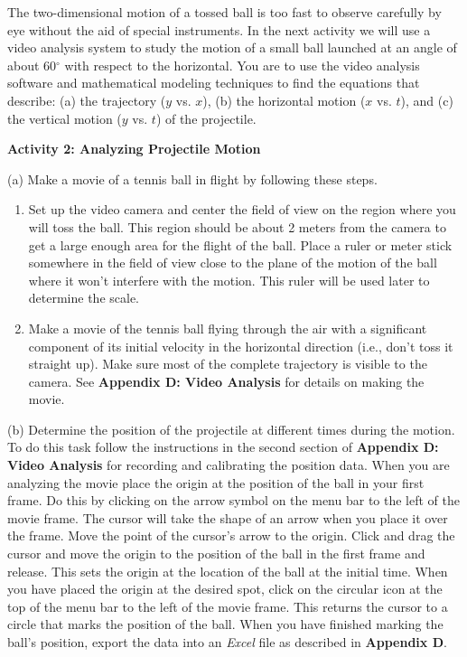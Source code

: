 The two-dimensional motion of a tossed ball is too fast to observe carefully
by eye without the aid of special instruments. In the next activity we will
use a video analysis system to study the motion of a small ball launched at
an angle of about 60\( ^{\circ } \) with respect to the horizontal. You are
to use the video analysis software and mathematical modeling techniques to find
the equations that describe: (a) the trajectory ($y$ vs. $x$), 
(b) the horizontal
motion ($x$ vs. $t$), and (c) the vertical motion ($y$ vs. 
$t$) of the projectile.

\textbf{Activity 2: Analyzing Projectile Motion} 

(a) Make a movie of a tennis ball in flight by following these steps. 

\begin{enumerate}
\item Set up the video camera and center the field of view on the region where you
will toss the ball. This region should be about 2 meters from the camera to
get a large enough area for the flight of the ball. Place a ruler or meter stick
somewhere in the field of view close to the plane of the motion of the ball
where it won't interfere with the motion. This ruler will be used later to determine
the scale. 
\item Make a movie of the tennis ball flying through the air with a significant component
of its initial velocity in the horizontal direction (i.e., don't toss it straight
up). Make sure most of the complete trajectory is visible to the camera. See
\textbf{Appendix D: Video Analysis} for details on making the movie. 

\end{enumerate}
(b) Determine the position of the projectile at different times during the motion.
To do this task follow the instructions in the second section of \textbf{Appendix
D: Video Analysis} for recording and calibrating the position data. When you
are analyzing the movie place the origin at the position of the ball in your
first frame. Do this by clicking on the arrow symbol on the menu bar to the
left of the movie frame. The cursor will take the shape of an arrow when you
place it over the frame. Move the point of the cursor's arrow to the origin.
Click and drag the cursor and move the origin to the position of the ball in
the first frame and release. This sets the origin at the location of the ball
at the initial time. When you have placed the origin at the desired spot, click
on the circular icon at the top of the menu bar to the left of the movie frame.
This returns the cursor to a circle that marks the position of the ball.
When you have finished marking the ball's position, export the data into
an \textit{Excel} file as described in \textbf{Appendix D}.

